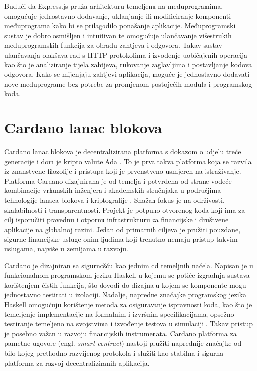 \documentclass[times, utf8, diplomski]{fer}
\begin{document}
Budući da Express.js pruža arhitekturu temeljenu na međuprogramima, omogućuje jednostavno dodavanje, uklanjanje ili modificiranje komponenti međuprograma kako bi se prilagodilo ponašanje aplikacije. Međuprogramski sustav je dobro osmišljen i intuitivan te omogućuje ulančavanje višestrukih međuprogramskih funkcija za obradu zahtjeva i odgovora. Takav sustav ulančavanja olakšava rad s HTTP protokolima i izvođenje uobičajenih operacija kao što je analiziranje tijela zahtjeva, rukovanje zaglavljima i postavljanje kodova odgovora. Kako se mijenjaju zahtjevi aplikacija, moguće je jednostavno dodavati nove međuprograme bez potrebe za promjenom postojećih modula i programskog koda.

\section{Cardano lanac blokova}

Cardano lanac blokova je decentralizirana platforma s dokazom o udjelu treće generacije i dom je kripto valute Ada \cite{brunjes2020utxo}. To je prva takva platforma koja se razvila iz znanstvene filozofije i pristupa koji je prvenstveno usmjeren na istraživanje. Platforma Cardano dizajnirana je od temelja i potvrđena od strane vodeće kombinacije vrhunskih inženjera i akademskih stručnjaka u područjima tehnologije lanaca blokova i kriptografije \cite{kerber2019ouroboros}. Snažan fokus je na održivosti, skalabilnosti i transparentnosti. Projekt je potpuno otvorenog koda koji ima za cilj isporučiti pravednu i otpornu infrastrukturu za financijske i društvene aplikacije na globalnoj razini. Jedan od primarnih ciljeva je pružiti pouzdane, sigurne financijske usluge onim ljudima koji trenutno nemaju pristup takvim uslugama, najviše u zemljama u razvoju.

Cardano je dizajniran sa sigurnošću kao jednim od temeljnih načela. Napisan je u funkcionalnom programskom jeziku Haskell u kojemu se potiče izgradnja sustava korištenjem čistih funkcija, što dovodi do dizajna u kojem se komponente mogu jednostavno testirati u izolaciji. Nadalje, napredne značajke programskog jezika Haskell omogućuju korištenje metoda za osiguravanje ispravnosti koda, kao što je temeljenje implementacije na formalnim i izvršnim specifikacijama, opsežno testiranje temeljeno na svojstvima i izvođenje testova u simulaciji \cite{lamela2018marlowe}. Takav pristup je posebno važan u razvoju financijskih instrumenata. Cardano platforma za pametne ugovore (engl. \emph{smart contract}) nastoji pružiti naprednije značajke od bilo kojeg prethodno razvijenog protokola i služiti kao stabilna i sigurna platforma za razvoj decentraliziranih aplikacija.
\end{document}
